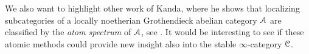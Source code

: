 \begin{remark}
    We also want to highlight other work of Kanda, where he shows that localizing subcategories of a locally noetherian Grothendieck abelian category $\EuScript{A}$ are classified by the \emph{atom spectrum} of $\EuScript{A}$, see \cite[5.5]{kanda_classifying_2012}. It would be interesting to see if these atomic methods could provide new insight also into the stable $\infty$-category $\EuScript{C}$. 
\end{remark}










